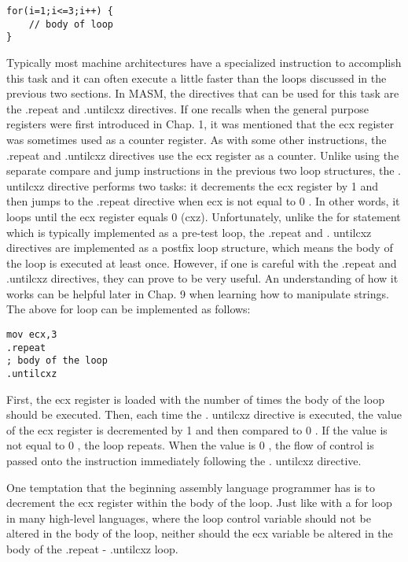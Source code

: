 \documentclass[10pt]{article}
\begin{document}
\begin{verbatim}
for(i=1;i<=3;i++) {
    // body of loop
}
\end{verbatim}

Typically most machine architectures have a specialized instruction to accomplish this task and it can often execute a little faster than the loops discussed in the previous two sections. In MASM, the directives that can be used for this task are the .repeat and .untilcxz directives. If one recalls when the general purpose registers were first introduced in Chap. 1, it was mentioned that the ecx register was sometimes used as a counter register. As with some other instructions, the .repeat and .untilcxz directives use the ecx register as a counter. Unlike using the separate compare and jump instructions in the previous two loop structures, the . untilcxz directive performs two tasks: it decrements the ecx register by 1 and then jumps to the .repeat directive when ecx is not equal to 0 . In other words, it loops until the ecx register equals 0 (cxz). Unfortunately, unlike the for statement which is typically implemented as a pre-test loop, the .repeat and . untilcxz directives are implemented as a postfix loop structure, which means the body of the loop is executed at least once. However, if one is careful with the .repeat and .untilcxz directives, they can prove to be very useful. An understanding of how it works can be helpful later in Chap. 9 when learning how to manipulate strings. The above for loop can be implemented as follows:

\begin{verbatim}
mov ecx,3
.repeat
; body of the loop
.untilcxz
\end{verbatim}

First, the ecx register is loaded with the number of times the body of the loop should be executed. Then, each time the . untilcxz directive is executed, the value of the ecx register is decremented by 1 and then compared to 0 . If the value is not equal to 0 , the loop repeats. When the value is 0 , the flow of control is passed onto the instruction immediately following the . untilcxz directive.

One temptation that the beginning assembly language programmer has is to decrement the ecx register within the body of the loop. Just like with a for loop in many high-level languages, where the loop control variable should not be altered in the body of the loop, neither should the ecx variable be altered in the body of the .repeat - .untilcxz loop.
\end{document}
